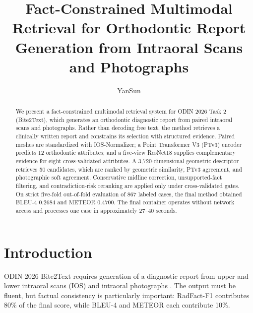 \documentclass[runningheads]{llncs}
\begin{document}
\title{Fact-Constrained Multimodal Retrieval for Orthodontic Report Generation from Intraoral Scans and Photographs}

\author{YanSun}

\maketitle

\begin{abstract}
We present a fact-constrained multimodal retrieval system for ODIN 2026 Task 2 (Bite2Text), which generates an orthodontic diagnostic report from paired intraoral scans and photographs. Rather than decoding free text, the method retrieves a clinically written report and constrains its selection with structured evidence. Paired meshes are standardized with IOS-Normalizer; a Point Transformer V3 (PTv3) encoder predicts 12 orthodontic attributes; and a five-view ResNet18 supplies complementary evidence for eight cross-validated attributes. A 3,720-dimensional geometric descriptor retrieves 50 candidates, which are ranked by geometric similarity, PTv3 agreement, and photographic soft agreement. Conservative midline correction, unsupported-fact filtering, and contradiction-risk reranking are applied only under cross-validated gates. On strict five-fold out-of-fold evaluation of 867 labeled cases, the final method obtained BLEU-4 0.2684 and METEOR 0.4700. The final container operates without network access and processes one case in approximately 27--40 seconds.

\end{abstract}

\section{Introduction}

ODIN 2026 Bite2Text requires generation of a diagnostic report from upper and lower intraoral scans (IOS) and intraoral photographs \cite{odin2026}. The output must be fluent, but factual consistency is particularly important: RadFact-F1 contributes 80\% of the final score, while BLEU-4 and METEOR each contribute 10\%.
\end{document}
